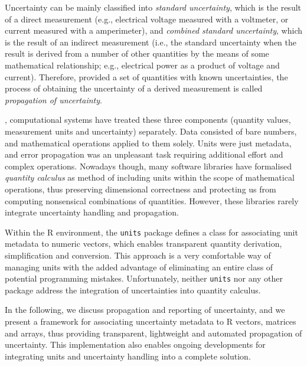 \documentclass[twoside,nohyper]{tufte-book}
\begin{document}
\fussy

Uncertainty can be mainly classified into \emph{standard uncertainty}, which is the result of a direct measurement (e.g., electrical voltage measured with a voltmeter, or current measured with a amperimeter), and \emph{combined standard uncertainty}, which is the result of an indirect measurement (i.e., the standard uncertainty when the result is derived from a number of other quantities by the means of some mathematical relationship; e.g., electrical power as a product of voltage and current). Therefore, provided a set of quantities with known uncertainties, the process of obtaining the uncertainty of a derived measurement is called \emph{propagation of uncertainty}.

, computational systems have treated these three components (quantity values, measurement units and uncertainty) separately. Data consisted of bare numbers, and mathematical operations applied to them solely. Units were just metadata, and error propagation was an unpleasant task requiring additional effort and complex operations. Nowadays though, many software libraries have formalised \emph{quantity calculus} as method of including units within the scope of mathematical operations, thus preserving dimensional correctness and protecting us from computing nonsensical combinations of quantities. However, these libraries rarely integrate uncertainty handling and propagation\cite[-15mm]{Flatter:2018}.

Within the R environment, the \texttt{units} package\cite[0pt]{CRAN:units,Pebesma:2016:units} defines a class for associating unit metadata to numeric vectors, which enables transparent quantity derivation, simplification and conversion. This approach is a very comfortable way of managing units with the added advantage of eliminating an entire class of potential programming mistakes. Unfortunately, neither \texttt{units} nor any other package address the integration of uncertainties into quantity calculus.

In the following, we discuss propagation and reporting of uncertainty, and we present a framework for associating uncertainty metadata to R vectors, matrices and arrays, thus providing transparent, lightweight and automated propagation of uncertainty. This implementation also enables ongoing developments for integrating units and uncertainty handling into a complete solution.
\end{document}

